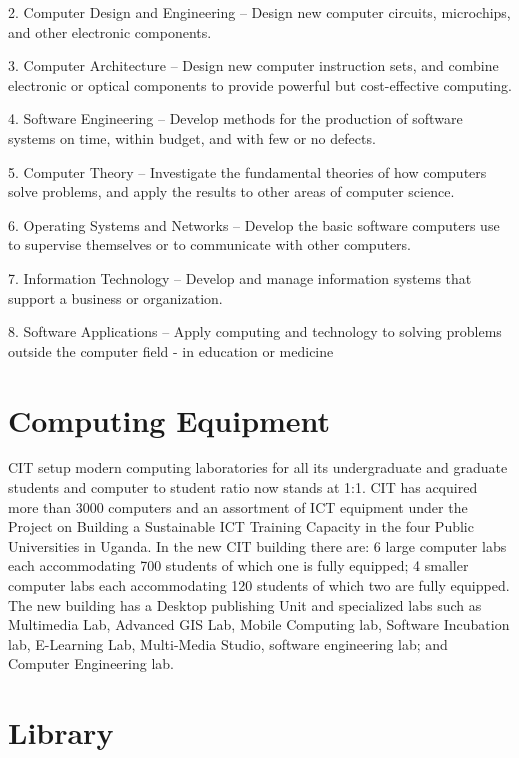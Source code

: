 \documentclass[a4paper,12pt]{article}
\begin{document}
2. Computer Design and Engineering – Design new computer circuits, microchips, and other electronic components.

3. Computer Architecture – Design new computer instruction sets, and combine electronic or optical components to provide powerful but cost-effective computing.

4. Software Engineering – Develop methods for the production of software systems on time, within budget, and with few or no defects.

5. Computer Theory – Investigate the fundamental theories of how computers solve problems, and apply the results to other areas of computer science.

6. Operating Systems and Networks – Develop the basic software computers use to supervise themselves or to communicate with other computers.

7. Information Technology – Develop and manage information systems that support a business or organization.

8. Software Applications – Apply computing and technology to solving problems outside the computer field - in education or medicine

\section{Computing Equipment}

CIT  setup modern computing laboratories for all its undergraduate and graduate students and computer to student ratio now stands at 1:1. CIT has acquired more than 3000 computers and an assortment of ICT equipment under the Project on Building a Sustainable ICT Training Capacity in the four Public Universities in Uganda. In the new CIT building there are: 6 large computer labs each accommodating 700 students of which one is fully equipped; 4 smaller computer labs each accommodating 120 students of which two
are fully equipped. The new building has a Desktop publishing Unit and specialized labs such as Multimedia Lab, Advanced GIS Lab, Mobile Computing lab, Software Incubation lab, E-Learning Lab, Multi-Media Studio, software engineering lab; and Computer Engineering lab.

\section{Library}
\end{document}
